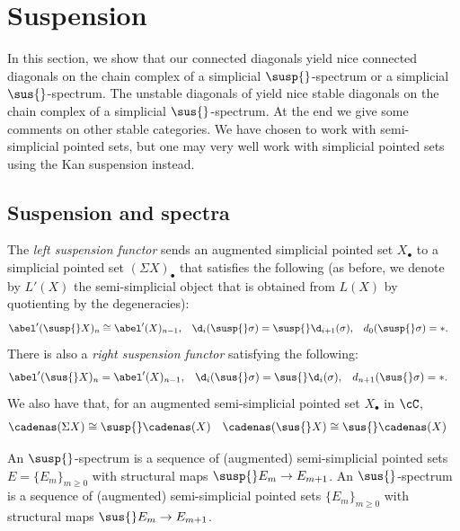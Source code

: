 
\section{Suspension}\label{s:suspension}


In this section, we show that our connected diagonals yield nice connected diagonals on the chain complex of a simplicial $\susp{}$-spectrum or a simplicial $\sus{}$-spectrum. The unstable diagonals of \cite{medina2021may_st} yield nice stable diagonals on the chain complex of a simplicial $\sus{}$-spectrum. At the end we give some comments on other stable categories. We have chosen to work with semi-simplicial pointed sets, but one may very well work with simplicial pointed sets using the Kan suspension instead.


\subsection{Suspension and spectra} The \emph{left suspension functor} sends an augmented simplicial pointed set $X_\bullet$ to a simplicial pointed set $(\Sigma X)_\bullet$ that satisfies the following (as before, we denote by $L'(X)$ the semi-simplicial object that is obtained from $L(X)$ by quotienting by the degeneracies):
\begin{align*}
 \abel'(\susp{} X)_n &\cong \abel'(X)_{n-1},& \d_i(\susp{}\sigma) &= \susp{} \d_{i+1}(\sigma),& d_{0}(\susp{}\sigma) &= *.
\end{align*}
There is also a \emph{right suspension functor} satisfying the following:
\begin{align*}
 \abel'(\sus{} X)_n &= \abel'(X)_{n-1}, &\d_i(\sus{}\sigma) &= \sus{} \d_i(\sigma),& d_{n+1}(\sus{} \sigma) &= *.
\end{align*}
We also have that, for an augmented semi-simplicial pointed set $X_\bullet$ in $\cC$,
\begin{align*}
 \cadenas(\Sigma X)&\cong \susp{} \cadenas(X) & \cadenas(\sus{}X) &\cong \sus{}\cadenas(X)
\end{align*}

An $\susp{}$-spectrum is a sequence of (augmented) semi-simplicial pointed sets $E = \{E_m\}_{m \geq 0}$ with structural maps $\susp{} E_m \to E_{m+1}$. An $\sus{}$-spectrum is a sequence of (augmented) semi-simplicial pointed sets $\{E_m\}_{m \geq 0}$ with structural maps $\sus{} E_m \to E_{m+1}$.

